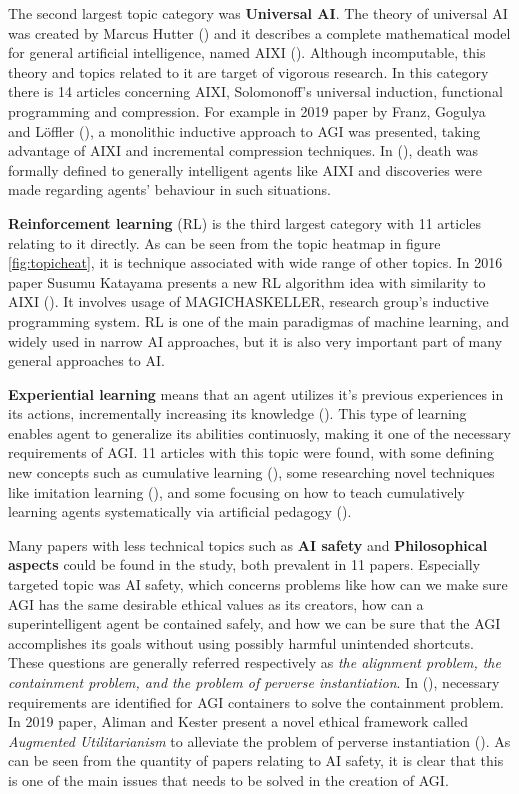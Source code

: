 \documentclass[utf8,english]{gradu3}
\begin{document}
The second largest topic category was \textbf{Universal AI}. The theory of
universal AI was created by Marcus Hutter (\cite*{hutter2004}) and it describes
a complete mathematical model for general artificial intelligence, named AIXI
(\cite{hutter2012decade}). Although incomputable, this theory and topics related
to it are target of vigorous research. In this category there is 14 articles
concerning AIXI, Solomonoff's universal induction, functional programming and
compression. For example in 2019 paper by Franz, Gogulya and Löffler
(\cite*{franz2019william}), a monolithic inductive approach to AGI was
presented, taking advantage of AIXI and incremental compression techniques. In
(\cite{martin2016death}), death was formally defined to generally intelligent
agents like AIXI and discoveries were made regarding agents' behaviour in such
situations.

\textbf{Reinforcement learning} (RL) is the third largest category with 11
articles relating to it directly. As can be seen from the topic heatmap in
figure \ref{fig:topicheat}, it is technique associated with wide range of other
topics. In 2016 paper Susumu Katayama presents a new RL algorithm idea with
similarity to AIXI (\cite{katayama2016ideas}). It involves usage of
MAGICHASKELLER, research group's inductive programming system. RL is one of the
main paradigmas of machine learning, and widely used in narrow AI approaches,
but it is also very important part of many general approaches to AI.

\textbf{Experiential learning} means that an agent utilizes it's previous
experiences in its actions, incrementally increasing its knowledge
(\cite{thorisson2019cumulative}). This type of learning enables agent to
generalize its abilities continuosly, making it one of the necessary
requirements of AGI. 11 articles with this topic were found, with some defining
new concepts such as cumulative learning (\cite{thorisson2019cumulative}), some
researching novel techniques like imitation learning (\cite{katz2016imitation}),
and some focusing on how to teach cumulatively learning agents systematically
via artificial pedagogy (\cite{bieger2017pentagon}).


Many papers with less technical topics such as \textbf{AI safety} and
\textbf{Philosophical aspects} could be found in the study, both prevalent in 11
papers. Especially targeted topic was AI safety, which concerns problems like how
can we make sure AGI has the same desirable ethical values as its creators, how
can a superintelligent agent be contained safely, and how we can be sure that
the AGI accomplishes its goals without using possibly harmful unintended
shortcuts. These questions are generally referred respectively as \emph{the
alignment problem, the containment problem, and the problem of perverse
instantiation}. In (\cite{babcock2016containment}), necessary requirements are
identified for AGI containers to solve the containment problem. In 2019 paper,
Aliman and Kester present a novel ethical framework called \emph{Augmented
Utilitarianism} to alleviate the problem of perverse instantiation
(\cite{aliman2019augmented}). As can be seen from the quantity of papers
relating to AI safety, it is clear that this is one of the main issues that
needs to be solved in the creation of AGI.
\end{document}

